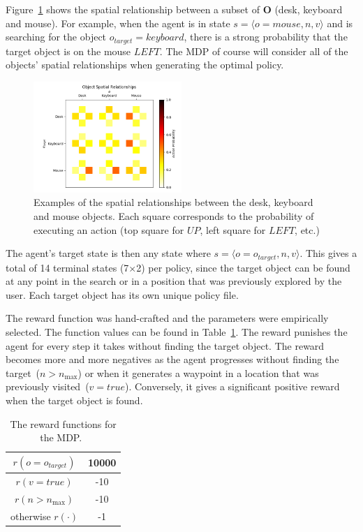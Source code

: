 \documentclass[a4paper, twoside]{article}
\begin{document}
Figure~\ref{fig:obj-relationships} shows the spatial relationship between a subset of $\mathbf{O}$ (desk, keyboard and mouse). For example, when the agent is in state ${s=\langle o=mouse, n, v \rangle}$ and is searching for the object $o_{target} = keyboard$, there is a strong probability that the target object is on the mouse $LEFT$. The MDP of course will consider all of the objects' spatial relationships when generating the optimal policy.

\begin{figure}
  \centering
  \includegraphics[width=0.5\textwidth]{figures/object_relationships.png}
  \caption{Examples of the spatial relationships between the desk, keyboard and mouse objects. Each square corresponds to the probability of executing an action (top square for $UP$, left square for $LEFT$, etc.)}\label{fig:obj-relationships}
\end{figure}

The agent's target state is then any state where ${s = \langle o=o_{target}, n, v \rangle}$. This gives a total of 14 terminal states (7$\times$2) per policy, since the target object can be found at any point in the search or in a position that was previously explored by the user. Each target object has its own unique policy file.

The reward function was hand-crafted and the parameters were empirically selected. The function values can be found in Table~\ref{tab:rewards}. The reward punishes the agent for every step it takes without finding the target object. The reward becomes more and more negatives as the agent progresses without finding the target~($n > n_{\max}$) or when it generates a waypoint in a location that was previously visited~($v = true$). Conversely, it gives a significant positive reward when the target object is found. 

\begin{table}
  \centering
  \caption{The reward functions for the MDP.\ }\label{tab:rewards}
  \begin{tabular}{cc}
    \toprule
    $r(o = o_{target})$ & 10000 \\ \midrule
    $r(v = true)$  & -10 \\ \midrule
    $r(n > n_{\max})$ & -10 \\ \midrule
    otherwise $r(\cdot)$ & -1  \\ \midrule
    \bottomrule
  \end{tabular}
\end{table}
\end{document}
